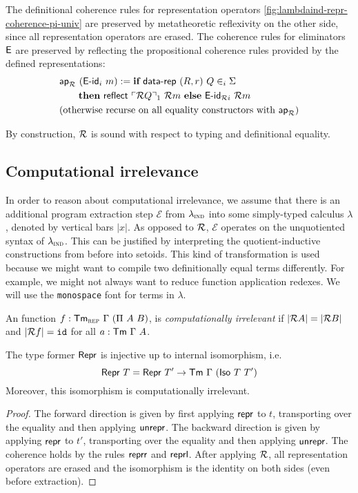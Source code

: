 The definitional coherence rules for representation operators
\cref{fig:lambdaind-repr-coherence-pi-univ} are preserved by metatheoretic
reflexivity on the other side, since all representation operators are erased.
The coherence rules for eliminators $\textsf{E}$ are preserved by reflecting the
propositional coherence rules provided by the defined representations:
\begin{align*}
& \mta{ap}_\R\ (\mta{E-id}_i\ m) :=  \kwd{if}\ \mta{data-rep}\ (R, r)\ Q \in_i \Sigma\ \\
      &\qquad \kwd{then}\ \mta{reflect}\ \emb{\R Q}_1\ \R m\ \kwd{else}\ \mta{E-id}_{\R i}\ \R m  \\
& \text{(otherwise recurse on all equality constructors with $\mta{ap}_\R$)}
\end{align*}

By construction, $\mathcal{R}$ is sound with respect to typing and definitional equality.

\subsection{Computational irrelevance}

In order to reason about computational irrelevance, we assume that there is
an additional program extraction step $\mathcal{E}$ from $\lambda_{\textsc{ind}}$ into some
simply-typed calculus $\lambda$, denoted by vertical bars $|x|$. As opposed to
$\mathcal{R}$, $\mathcal{E}$ operates on the unquotiented syntax of $\lambda_{\textsc{ind}}$. This
can be justified by interpreting the quotient-inductive constructions from
before into setoids. This kind of
transformation is used because we might want to compile two definitionally equal
terms differently. For example, we might not always want to reduce function
application redexes. We will use the \texttt{monospace} font for terms in
$\lambda$.

\begin{definition}
    An function $f : \mta{Tm}_\rep\ \Gamma\ (\Pi\ A\ B)$, is \emph{computationally irrelevant} if
    $|\mathcal{R} A| = |\mathcal{R} B|$ and $|\mathcal{R} f| = \texttt{id}$ for all $a : \textsf{Tm}\ \Gamma\ A$.
\end{definition}

\begin{lemma}
	The type former $\textsf{Repr}{}$ is injective up to internal isomorphism, i.e.
	\begin{equation}
	\mta{Repr}\ T = \mta{Repr}\ T' \to \Tm\ \Gamma\ (\mta{Iso}\ T\ T')
	\end{equation}
	Moreover, this isomorphism is computationally irrelevant.
	\begin{proof}
	The forward direction is given by first applying $\textsf{repr}$ to $t$,
	transporting over the equality and then applying $\textsf{unrepr}$. The
	backward direction is given by applying $\textsf{repr}$ to $t'$, transporting
	over the equality and then applying $\textsf{unrepr}$. The coherence holds by
	the rules $\textsf{reprr}$ and $\textsf{reprl}$. After applying $\mathcal{R}$, all
	representation operators are erased and the isomorphism is the identity on both
	sides (even before extraction).
	\end{proof}
\end{lemma}


